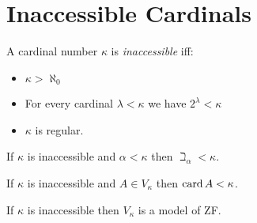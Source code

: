 \section{Inaccessible Cardinals}

\begin{definition}[Inaccessible]
    A cardinal number $\kappa$ is \emph{inaccessible}
    iff:
    \begin{itemize}
        \item $\kappa > \aleph_0$
        \item For every cardinal $\lambda < \kappa$ we have $2^\lambda < \kappa$
        \item $\kappa$ is regular.   
    \end{itemize}
\end{definition}

\begin{lemma}
    If $\kappa$ is inaccessible and $\alpha < \kappa$ then $\beth_\alpha < \kappa$.
\end{lemma}

\begin{lemma}
    If $\kappa$ is inaccessible and $A \in V_\kappa$ then $\operatorname{card} A < \kappa$.
\end{lemma}

\begin{theorem}
    If $\kappa$ is inaccessible then $V_\kappa$ is a model of ZF.
\end{theorem}
